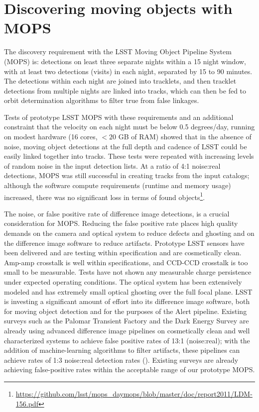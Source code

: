 \documentclass{iau}
\begin{document}
\section{Discovering moving objects with MOPS}

The discovery requirement with the LSST Moving Object Pipeline System
(MOPS) is: detections on least three separate nights within a 15 night
window, with at least two detections (visits) in each night, separated
by 15 to 90 minutes. The detections within each night are joined into
tracklets, and then tracklet detections from multiple nights are
linked into tracks, which can then be fed to orbit determination
algorithms to filter true from false linkages.

Tests of prototype LSST MOPS with these requirements and an additional
constraint that the velocity on each night must be below 0.5
degrees/day, running on modest hardware (16 cores, $<20$ GB of RAM)
showed that in the absence of noise, moving object detections at the
full depth and cadence of LSST could be easily linked together into
tracks. These tests were repeated with increasing levels of random
noise in the input detection lists. At a ratio of 4:1 noise:real
detections, MOPS was still successful in creating tracks from the
input catalogs; although the software compute requirements (runtime
and memory usage) increased, there was no significant loss in terms of
found
objects\footnote{\url{https://github.com/lsst/mops_daymops/blob/master/doc/report2011/LDM-156.pdf}}.

The noise, or false positive rate of difference image detections, is a
crucial consideration for MOPS. Reducing the false positive rate
places high quality demands on the camera and optical system to reduce
defects and ghosting and on the difference image software to reduce
artifacts. Prototype LSST sensors have been delivered and are testing
within specification and are cosmetically clean. Amp-amp crosstalk is
well within specifications, and CCD-CCD crosstalk is too small to be
measurable. Tests have not shown any measurable charge persistence
under expected operating conditions. The optical system has been
extensively modeled and has extremely small optical ghosting over the
full focal plane. LSST is investing a significant amount of effort
into its difference image software, both for moving object detection
and for the purposes of the Alert pipeline. Existing surveys such as
the Palomar Transient Factory and the Dark Energy Survey are already
using advanced difference image pipelines on cosmetically clean and
well characterized systems to achieve false positive rates of 13:1
(noise:real); with the addition of machine-learning algorithms to
filter artifacts, these pipelines can achieve rates of 1:3 noise:real
detection rates (\cite{goldstein}). Existing surveys are already achieving false-positive
rates within the acceptable range of our prototype MOPS.
\end{document}
